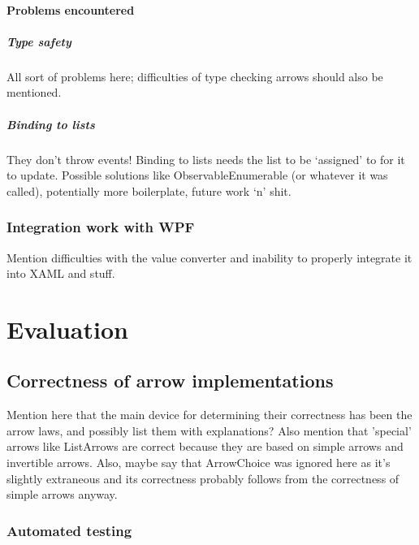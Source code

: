 \documentclass[12pt,twoside,notitlepage]{report}
\begin{document}
\subsubsection{Problems encountered}

\paragraph{Type safety}

All sort of problems here; difficulties of type checking arrows should also be mentioned.

\paragraph{Binding to lists}

They don't throw events! Binding to lists needs the list to be ‘assigned’ to for it to update. Possible solutions like ObservableEnumerable (or whatever it was called), potentially more boilerplate, future work ‘n’ shit.

\subsection{Integration work with WPF}

Mention difficulties with the value converter and inability to properly integrate it into XAML and stuff.

\cleardoublepage



\chapter{Evaluation}

\section{Correctness of arrow implementations}

Mention here that the main device for determining their correctness has been the arrow laws, and possibly list them with explanations? Also mention that 'special' arrows like ListArrows are correct because they are based on simple arrows and invertible arrows. Also, maybe say that ArrowChoice was ignored here as it's slightly extraneous and its correctness probably follows from the correctness of simple arrows anyway.

\subsection{Automated testing}
\end{document}
